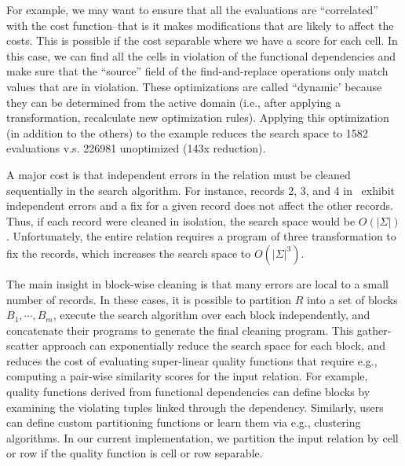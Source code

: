 
For example, we may want to ensure that all the evaluations are ``correlated'' with the cost function--that is it makes modifications that are likely to affect the costs.  This is possible if the cost separable where we have a score for each cell. In this case, we can find all the cells in violation of the functional dependencies and make sure that the ``source'' field of the find-and-replace operations only match values that are in violation.  These optimizations are called ``dynamic' because they can be determined from the active domain (i.e., after applying a transformation, recalculate new optimization rules).  Applying this optimization (in addition to the others) to the example reduces the search space to 1582 evaluations v.s. 226981 unoptimized (143x reduction).

A major cost is that independent errors in the relation must be cleaned sequentially in the search algorithm.  For instance, records 2, 3, and 4 in~ exhibit independent errors and a fix for a given record does not affect the other records.  Thus, if each record were cleaned in isolation, the search space would be $O(|\Sigma|)$.  Unfortunately, the entire relation requires a program of three transformation to fix the records, which increases the search space to $O(|\Sigma|^3)$.

The main insight in block-wise cleaning is that many errors are local to a small number of records.  In these cases, it is possible to partition $R$ into a set of blocks $B_1,\cdots,B_m$, execute the search algorithm over each block independently, and concatenate their programs to generate the final cleaning program.  This gather-scatter approach can exponentially reduce the search space for each block, and reduces the cost of evaluating super-linear quality functions that require e.g., computing a pair-wise similarity scores for the input relation.    For example, quality functions derived from functional dependencies can define blocks by examining the violating tuples linked through the dependency.  Similarly, users can define custom partitioning functions or learn them via e.g., clustering algorithms.  In our current implementation, we partition the input relation by cell or row if the quality function is cell or row separable.


